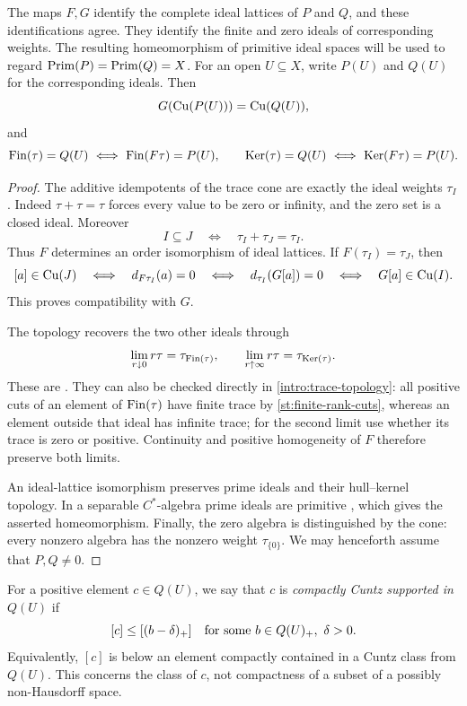 \begin{proposition}\label{st:ideals}
The maps \(F,G\) identify the complete ideal lattices of \(P\) and
\(Q\), and these identifications agree. They identify the finite
and zero ideals of corresponding weights. The resulting
homeomorphism of primitive ideal spaces will be used to regard
\(\operatorname{Prim}(P)=\operatorname{Prim}(Q)=X\). For an open \(U\subseteq X\), write
\(P(U)\) and \(Q(U)\) for the corresponding ideals. Then
\[
 G(\operatorname{Cu}(P(U)))=\operatorname{Cu}(Q(U)),
\]
and
\[
 \Fin(\tau)=Q(U)\ \Longleftrightarrow\ \Fin(F\tau)=P(U),
 \qquad
 \Ker(\tau)=Q(U)\ \Longleftrightarrow\ \Ker(F\tau)=P(U).
\]
\end{proposition}

\begin{proof}
The additive idempotents of the trace cone are exactly the ideal
weights \(\tau_I\). Indeed \(\tau+\tau=\tau\) forces every
value to be zero or infinity, and the zero set is a closed ideal.
Moreover
\[
 I\subseteq J\quad\Longleftrightarrow\quad
 \tau_I+\tau_J=\tau_I.
\]
Thus \(F\) determines an order isomorphism of ideal lattices.
If \(F(\tau_I)=\tau_J\), then
\[
 [a]\in\operatorname{Cu}(J)
 \quad\Longleftrightarrow\quad
 d_{F\tau_I}(a)=0
 \quad\Longleftrightarrow\quad
 d_{\tau_I}(G[a])=0
 \quad\Longleftrightarrow\quad
 G[a]\in\operatorname{Cu}(I).
\]
This proves compatibility with \(G\).

The topology recovers the two other ideals through
\begin{equation}\label{st:scalar-limits}
 \lim_{r\downarrow0}r\tau=\tau_{\operatorname{Fin}(\tau)},
 \qquad
 \lim_{r\uparrow\infty}r\tau=\tau_{\operatorname{Ker}(\tau)}.
\end{equation}
These are \cite[Equation~(3.4)]{ERS}. They can also be checked
directly in \eqref{intro:trace-topology}: all positive cuts of an
element of \(\operatorname{Fin}(\tau)\) have finite trace by
\eqref{st:finite-rank-cuts}, whereas an element outside that ideal
has infinite trace; for the second limit use whether its trace is
zero or positive. Continuity and positive homogeneity of \(F\)
therefore preserve both limits.

An ideal-lattice isomorphism preserves prime ideals and their
hull--kernel topology. In a separable \(C^*\)-algebra prime ideals
are primitive \cite[Corollary~1]{DixmierPrime}, which gives the
asserted homeomorphism.
Finally, the zero algebra is distinguished by the cone: every nonzero
algebra has the nonzero weight \(\tau_{\{0\}}\). We may henceforth
assume that \(P,Q\ne0\).
\end{proof}

For a positive element \(c\in Q(U)\), we say that \(c\) is
\emph{compactly Cuntz supported in \(Q(U)\)} if
\begin{equation}\label{st:compact-controller}
 [c]\leq[(b-\delta)_+]
 \quad\hbox{for some }b\in Q(U)_+,\ \delta>0.
\end{equation}
Equivalently, \([c]\) is below an element compactly contained in a
Cuntz class from \(Q(U)\). This concerns the class of \(c\), not
compactness of a subset of a possibly non-Hausdorff space.


